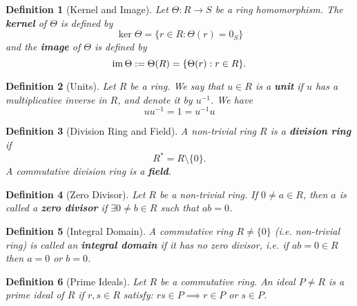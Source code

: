 \documentclass[9pt,landscape,a4paper]{article}
\newcommand{\hlimpo}[1]{\textcolor{base16-eighties-red}{#1}}
\newcommand{\hlnoteb}[1]{\textcolor{base16-eighties-magenta}{\textbf{#1}}}
\theoremstyle{empty}
\newtheorem{defn}{Definition}
\begin{document}
\begin{multicols*}{5}
\begin{defn}[Kernel and Image]
\label{defn:kernel_and_image}
  Let $\Theta: R \to S$ be a ring homomorphism. The \hlnoteb{kernel} of $\Theta$ is defined by
  \begin{equation*}
    \ker \Theta = \{r \in R : \Theta(r) = 0_S\}
  \end{equation*}
  and the \hlnoteb{image} of $\Theta$ is defined by
  \begin{equation*}
    \operatorname{im} \Theta := \Theta(R) = \{\Theta(r) : r \in R\}.
  \end{equation*}
\end{defn}

\begin{defn}[Units]
\label{defn:units_and_group_of_units}
  Let $R$ be a ring. We say that $u \in R$ is a \hlnoteb{unit} if $u$ has a multiplicative inverse in $R$, and denote it by $u^{-1}$. We have
  \begin{equation*}
    uu^{-1} = 1 = u^{-1} u
  \end{equation*}
\end{defn}

\begin{defn}[Division Ring and Field]
\label{defn:division_ring_and_field}
  A non-trivial ring $R$ is a \hlnoteb{division ring} if
  \begin{equation*}
    R^* = R \setminus \{0\}.
  \end{equation*}
  A commutative division ring is a \hlnoteb{field}.
\end{defn}

\begin{defn}[Zero Divisor]
\label{defn:zero_divisor}
  Let $R$ be a non-trivial ring. If $0 \neq a \in R$, then $a$ is called a \hlnoteb{zero divisor} if $\exists 0 \neq b \in R$ such that $ab = 0$.
\end{defn}

\begin{defn}[Integral Domain]
\label{defn:integral_domain}
A commutative ring $R \neq \{0\}$ (i.e. non-trivial ring) is called an \hlnoteb{integral domain} if it has \hlimpo{no zero divisor}, i.e. if $ab = 0 \in R$ then $a = 0$ or $b = 0$.
\end{defn}

\begin{defn}[Prime Ideals]
\label{defn:prime_ideals}
  Let $R$ be a commutative ring. An ideal $P \neq R$ is a prime ideal of $R$ if $r, s \in R$ satisfy: $rs \in P \implies r \in P$ or $s \in P$.
\end{defn}


\end{multicols*}
\end{document}
